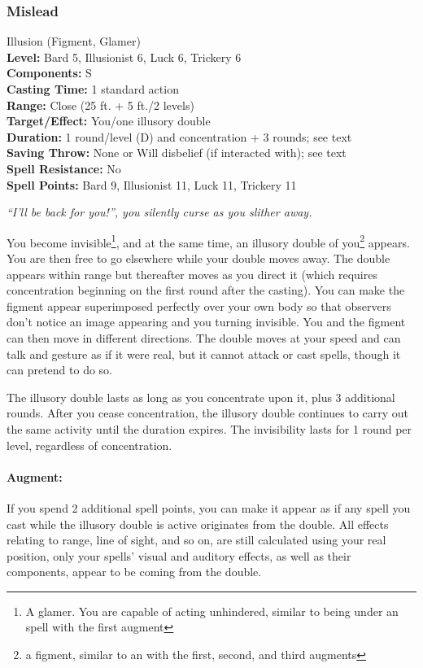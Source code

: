 \subsubsection{Mislead}
\label{Spell:Mislead}
Illusion (Figment, Glamer)
\\ \textbf{Level:} Bard 5, Illusionist 6, Luck 6, Trickery 6
\\ \textbf{Components:} S
\\ \textbf{Casting Time:} 1 standard action
\\ \textbf{Range:} Close (25 ft. + 5 ft./2 levels)
\\ \textbf{Target/Effect:} You/one illusory double
\\ \textbf{Duration:} 1 round/level (D) and concentration + 3 rounds; see text
\\ \textbf{Saving Throw:} None or Will disbelief (if interacted with); see text
\\ \textbf{Spell Resistance:} No
\\ \textbf{Spell Points:} Bard 9, Illusionist 11, Luck 11, Trickery 11

\emph{``I'll be back for you!'', you silently curse as you slither away.}

You become invisible\footnote{A glamer. You are capable of acting unhindered, similar to being under an  spell with the first augment}, and at the same time, an illusory double of you\footnote{a figment, similar to an  with the first, second, and third augments} appears. You are then free to go elsewhere while your double moves away. 
The double appears within range but thereafter moves as you direct it (which requires concentration beginning on the first round after the casting). 
You can make the figment appear superimposed perfectly over your own body so that observers don't notice an image appearing and you turning invisible. 
You and the figment can then move in different directions. 
The double moves at your speed and can talk and gesture as if it were real, but it cannot attack or cast spells, though it can pretend to do so.

The illusory double lasts as long as you concentrate upon it, plus 3 additional rounds. After you cease concentration, 
the illusory double continues to carry out the same activity until the duration expires. 
The invisibility lasts for 1 round per level, regardless of concentration. 

\paragraph{Augment:} If you spend 2 additional spell points, you can make it appear as if any spell you cast while the illusory double is active originates from the double.
All effects relating to range, line of sight, and so on, are still calculated using your real position, only your spells' visual and auditory effects, as well as their components,
appear to be coming from the double.
